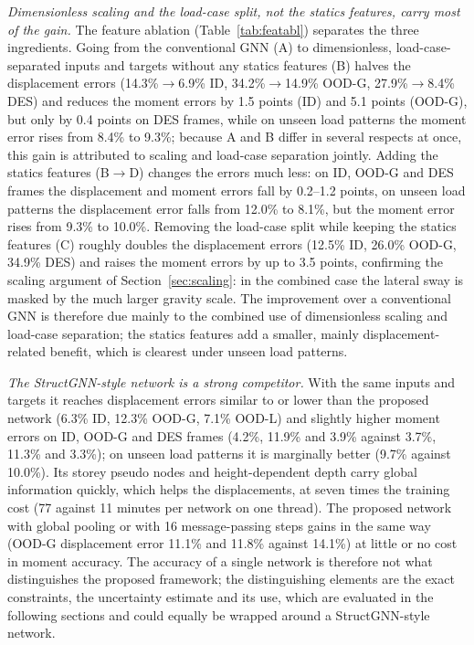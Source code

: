 \emph{Dimensionless scaling and the load-case split, not the statics features, carry most of the gain.} The feature ablation (Table~\ref{tab:featabl}) separates the three ingredients. Going from the conventional GNN (A) to dimensionless, load-case-separated inputs and targets without any statics features (B) halves the displacement errors (14.3\%$\to$6.9\% ID, 34.2\%$\to$14.9\% OOD-G, 27.9\%$\to$8.4\% DES) and reduces the moment errors by 1.5 points (ID) and 5.1 points (OOD-G), but only by 0.4 points on DES frames, while on unseen load patterns the moment error rises from 8.4\% to 9.3\%; because A and B differ in several respects at once, this gain is attributed to scaling and load-case separation jointly. Adding the statics features (B$\to$D) changes the errors much less: on ID, OOD-G and DES frames the displacement and moment errors fall by 0.2--1.2 points, on unseen load patterns the displacement error falls from 12.0\% to 8.1\%, but the moment error rises from 9.3\% to 10.0\%. Removing the load-case split while keeping the statics features (C) roughly doubles the displacement errors (12.5\% ID, 26.0\% OOD-G, 34.9\% DES) and raises the moment errors by up to 3.5 points, confirming the scaling argument of Section~\ref{sec:scaling}: in the combined case the lateral sway is masked by the much larger gravity scale. The improvement over a conventional GNN is therefore due mainly to the combined use of dimensionless scaling and load-case separation; the statics features add a smaller, mainly displacement-related benefit, which is clearest under unseen load patterns.

\emph{The StructGNN-style network is a strong competitor.} With the same inputs and targets it reaches displacement errors similar to or lower than the proposed network (6.3\% ID, 12.3\% OOD-G, 7.1\% OOD-L) and slightly higher moment errors on ID, OOD-G and DES frames (4.2\%, 11.9\% and 3.9\% against 3.7\%, 11.3\% and 3.3\%); on unseen load patterns it is marginally better (9.7\% against 10.0\%). Its storey pseudo nodes and height-dependent depth carry global information quickly, which helps the displacements, at seven times the training cost (77 against 11 minutes per network on one thread). The proposed network with global pooling or with 16 message-passing steps gains in the same way (OOD-G displacement error 11.1\% and 11.8\% against 14.1\%) at little or no cost in moment accuracy. The accuracy of a single network is therefore not what distinguishes the proposed framework; the distinguishing elements are the exact constraints, the uncertainty estimate and its use, which are evaluated in the following sections and could equally be wrapped around a StructGNN-style network.

